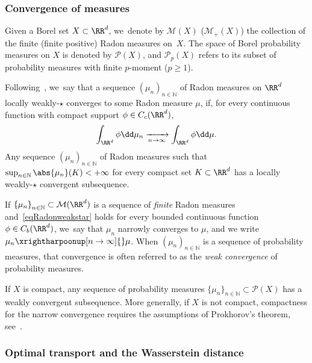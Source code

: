 \subsubsection{Convergence of measures}
Given a Borel set $X\subset \RR^d$, we~denote by $\mathcal{M}(X)$ (\resp $\mathcal{M}_+(X)$) the collection of the finite (\resp finite positive) Radon measures on~$X$.
The space of Borel probability measures on $X$ is denoted by $\mathcal{P}(X)$, and $\mathcal{P}_p(X)$ refers to its subset of probability measures with finite $p$-moment ($p\ge 1$).

Following~\cite{ambrosio2000functions}, we~say that a sequence $\left(\mu_n\right)_{n \in \mathbb{N}}$ of Radon measures on $\RR^d$ locally weakly-$\star$ converges to some Radon measure $\mu$, if, for every continuous function with compact support $\phi \in C_c(\RR^d)$,
\begin{equation}\label{eqRadonweakstar}
\int_{\RR^d} \phi \dd \mu_n
\xrightarrow[n \to \infty]{}
\int_{\RR^d} \phi \dd \mu.
\end{equation}
Any sequence $(\mu_n)_{n\in\mathbb{N}}$ of Radon measures such that $\sup_{n\in\mathbb{N}} \abs{\mu_n}(K)<+\infty$ for every compact set $K\subset \RR^d$ has a locally weakly-$\star$ convergent subsequence.

If $\left\{\mu_n\right\}_{n \in \mathbb{N}}\subset \mathcal{M}(\RR^d)$ is a sequence of \emph{finite} Radon measures and~\eqref{eqRadonweakstar} holds for every bounded continuous function $\phi\in C_b(\RR^d)$, we~say that $\mu_n$ narrowly converges to $\mu$, and we write $\mu_n \xrightharpoonup[n \to \infty]{} \mu$. When $(\mu_n)_{n\in\mathbb{N}}$ is a sequence of probability measures, that convergence is often referred to as the \emph{weak convergence} of probability measures.

If $X$ is compact, any sequence of probability measures $\{\mu_n\}_{n\in\mathbb{N}}\subset \mathcal{P}(X)$ has a weakly convergent subsequence.
More generally, if $X$ is not compact, compactness for the narrow convergence requires the assumptions of Prokhorov's theorem,
see~\hbox{\cite[Th.\,2.8]{ambrosio2021lectures}}.

\subsubsection{Optimal transport and the Wasserstein distance}
\label{sec:wasserstein}

